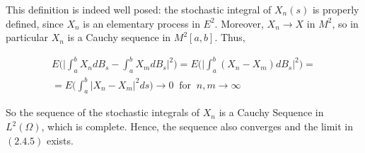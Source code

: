 This definition is indeed well posed: the stochastic integral of $X_n(s)$ is properly defined, since $X_n$ is an elementary process in $E^2$. Moreover, $X_n \to X$ in $M^2$, so in particular $X_n$ is a Cauchy sequence in $M^2[a,b]$. Thus,

\begin{gather*}
    E\Bigg( \Bigg\vert \int_a^b X_n dB_s - \int_a^b X_m dB_s \Bigg\vert^2 \Bigg) = E\Bigg( \Bigg\vert \int_a^b (X_n - X_m) dB_s \Bigg\vert^2 \Bigg) = \\
    = E\Bigg( \int_a^b \vert X_n - X_m \vert^2 ds \Bigg) \to 0 \;\; \text{for} \;\; n,m \to \infty
\end{gather*}

So the sequence of the stochastic integrals of $X_n$ is a Cauchy Sequence in $L^2(\Omega)$, which is complete. Hence, the sequence also converges and the limit in $(2.4.5)$ exists. 

